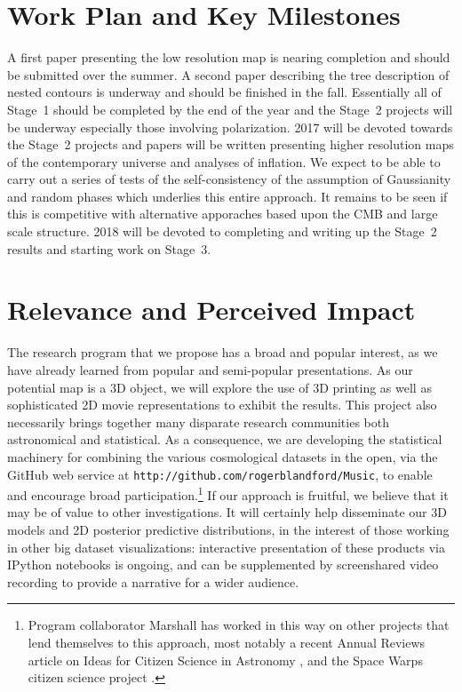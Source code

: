 \documentclass[psfig,12pt]{article}
\begin{document}
{%

\section{Work Plan and Key Milestones}
\label{sec:plan}

A first paper presenting the low resolution map is nearing completion
and should be submitted over the summer.  A second paper describing the
tree description of nested contours is underway and should be finished
in the fall. Essentially all of Stage~1 should be completed by the end
of the year and the Stage~2 projects will be underway especially those
involving polarization. 2017 will be devoted towards the Stage~2
projects and papers will be written presenting higher resolution maps of
the contemporary universe and analyses of inflation. We expect to be
able to carry out a series of tests of the self-consistency of the
assumption of Gaussianity and random phases which underlies this entire
approach. It remains to be seen if this is competitive with alternative
apporaches based upon the CMB and large scale structure.
2018 will be devoted to completing and writing up the Stage~2 results
and starting work on Stage~3.


\section{Relevance and Perceived Impact}
\label{sec:impact}

The research program that we propose has a broad and popular interest,
as we have already learned from popular and semi-popular presentations.
As our potential map is a 3D object,
we will explore the use of 3D printing as well as sophisticated 2D movie
representations to exhibit the results. This project also necessarily
brings together many disparate research communities both astronomical
and statistical. As a consequence, we are developing the statistical
machinery for combining the various cosmological datasets in the open,
via the GitHub web service at
\texttt{http://github.com/rogerblandford/Music}, to enable and encourage
broad participation.\footnote{Program collaborator Marshall has worked in this way on other
projects that lend themselves to this approach, most notably a recent
Annual Reviews article on Ideas for Citizen Science in Astronomy
\cite{CitSciReview}, and the Space Warps citizen science project
\cite{SpaceWarps}.}
If our approach is fruitful, we believe that it may be of value to other
investigations. It will certainly help disseminate our 3D models and 2D
posterior predictive distributions, in the interest of those working in
other big dataset visualizations: interactive presentation of these
products via IPython notebooks is ongoing, and can be supplemented by
screenshared video recording to provide a narrative for a wider
audience.

}
\end{document}
